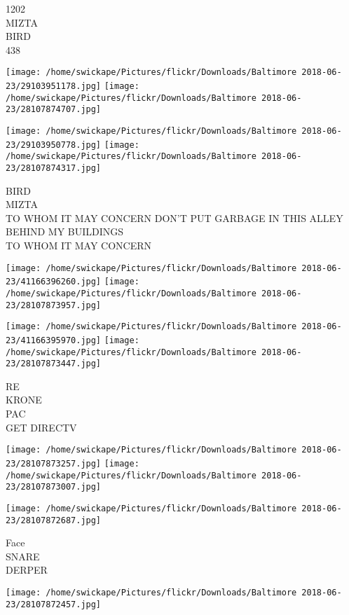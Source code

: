 \documentclass[10pt,letterpaper]{article}
\begin{document}
1202\\
MIZTA\\
BIRD\\
438\\
\pagebreak

\texttt{[image: /home/swickape/Pictures/flickr/Downloads/Baltimore 2018-06-23/29103951178.jpg]}
\texttt{[image: /home/swickape/Pictures/flickr/Downloads/Baltimore 2018-06-23/28107874707.jpg]}

\texttt{[image: /home/swickape/Pictures/flickr/Downloads/Baltimore 2018-06-23/29103950778.jpg]}
\texttt{[image: /home/swickape/Pictures/flickr/Downloads/Baltimore 2018-06-23/28107874317.jpg]}

BIRD\\
MIZTA\\
TO WHOM IT MAY CONCERN DON'T PUT GARBAGE IN THIS ALLEY BEHIND MY BUILDINGS\\
TO WHOM IT MAY CONCERN\\
\pagebreak

\texttt{[image: /home/swickape/Pictures/flickr/Downloads/Baltimore 2018-06-23/41166396260.jpg]}
\texttt{[image: /home/swickape/Pictures/flickr/Downloads/Baltimore 2018-06-23/28107873957.jpg]}

\texttt{[image: /home/swickape/Pictures/flickr/Downloads/Baltimore 2018-06-23/41166395970.jpg]}
\texttt{[image: /home/swickape/Pictures/flickr/Downloads/Baltimore 2018-06-23/28107873447.jpg]}

RE\\
KRONE\\
PAC\\
GET DIRECTV\\
\pagebreak

\texttt{[image: /home/swickape/Pictures/flickr/Downloads/Baltimore 2018-06-23/28107873257.jpg]}
\texttt{[image: /home/swickape/Pictures/flickr/Downloads/Baltimore 2018-06-23/28107873007.jpg]}

\vspace{0.25in}
\texttt{[image: /home/swickape/Pictures/flickr/Downloads/Baltimore 2018-06-23/28107872687.jpg]}

Face\\
SNARE\\
DERPER\\
\pagebreak

\texttt{[image: /home/swickape/Pictures/flickr/Downloads/Baltimore 2018-06-23/28107872457.jpg]}
\end{document}
